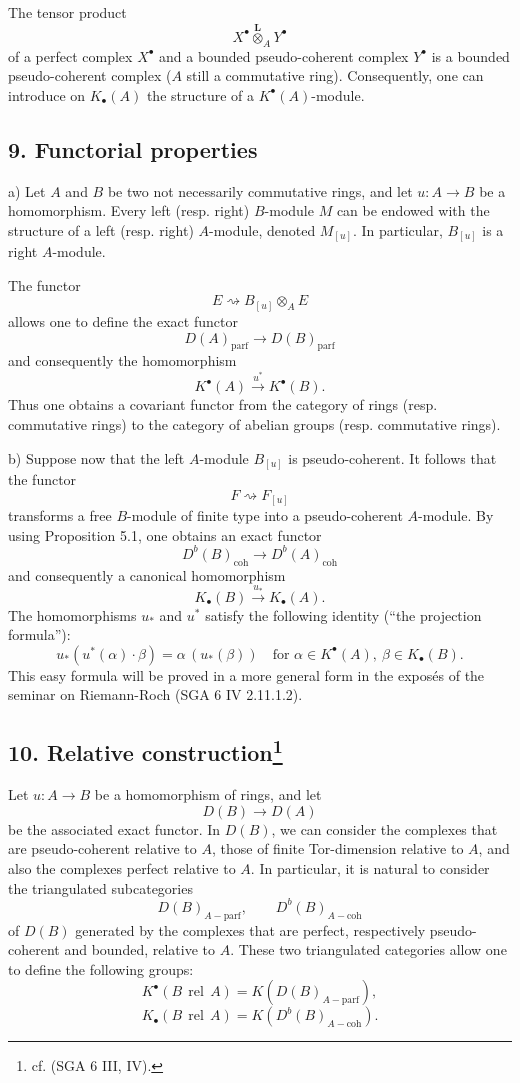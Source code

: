 \documentclass[11pt]{article}
\providecommand{\parf}{\mathrm{parf}}
\providecommand{\coh}{\mathrm{coh}}
\providecommand{\parf}{\mathrm{parf}}
\providecommand{\coh}{\mathrm{coh}}
\begin{document}
The tensor product
\[
X^\bullet\overset{\mathbf L}{\otimes}_A Y^\bullet
\]
of a perfect complex $X^\bullet$ and a bounded pseudo-coherent complex $Y^\bullet$ is a bounded pseudo-coherent complex ($A$ still a commutative ring). Consequently, one can introduce on $K_\bullet(A)$ the structure of a $K^\bullet(A)$-module.

\subsection*{9. Functorial properties}

a) Let $A$ and $B$ be two not necessarily commutative rings, and let $u:A\to B$ be a homomorphism. Every left (resp. right) $B$-module $M$ can be endowed with the structure of a left (resp. right) $A$-module, denoted $M_{[u]}$. In particular, $B_{[u]}$ is a right $A$-module.

The functor
\[
E\rightsquigarrow B_{[u]}\otimes_A E
\]
allows one to define the exact functor
\[
D(A)_{\parf}\longrightarrow D(B)_{\parf}
\]
and consequently the homomorphism
\[
K^\bullet(A)\xrightarrow{u^*}K^\bullet(B).
\]
Thus one obtains a covariant functor from the category of rings (resp. commutative rings) to the category of abelian groups (resp. commutative rings).

b) Suppose now that the left $A$-module $B_{[u]}$ is pseudo-coherent. It follows that the functor
\[
F\rightsquigarrow F_{[u]}
\]
transforms a free $B$-module of finite type into a pseudo-coherent $A$-module. By using Proposition 5.1, one obtains an exact functor
\[
D^b(B)_{\coh}\longrightarrow D^b(A)_{\coh}
\]
and consequently a canonical homomorphism
\[
K_\bullet(B)\xrightarrow{u_*}K_\bullet(A).
\]
The homomorphisms $u_*$ and $u^*$ satisfy the following identity (``the projection formula''):
\[
u_*(u^*(\alpha)\cdot \beta)=\alpha\,(u_*(\beta))
\quad\text{for }\alpha\in K^\bullet(A),\ \beta\in K_\bullet(B).
\]
This easy formula will be proved in a more general form in the exposés of the seminar on Riemann-Roch (SGA 6 IV 2.11.1.2).

\subsection*{10. Relative construction\footnote{cf. (SGA 6 III, IV).}}

Let $u:A\to B$ be a homomorphism of rings, and let
\[
D(B)\longrightarrow D(A)
\]
be the associated exact functor. In $D(B)$, we can consider the complexes that are pseudo-coherent relative to $A$, those of finite Tor-dimension relative to $A$, and also the complexes perfect relative to $A$. In particular, it is natural to consider the triangulated subcategories
\[
D(B)_{A-\parf},\qquad D^b(B)_{A-\coh}
\]
of $D(B)$ generated by the complexes that are perfect, respectively pseudo-coherent and bounded, relative to $A$. These two triangulated categories allow one to define the following groups:
\[
K^\bullet(B\operatorname{\,rel\,}A)=K(D(B)_{A-\parf}),
\]
\[
K_\bullet(B\operatorname{\,rel\,}A)=K(D^b(B)_{A-\coh}).
\]
\end{document}
